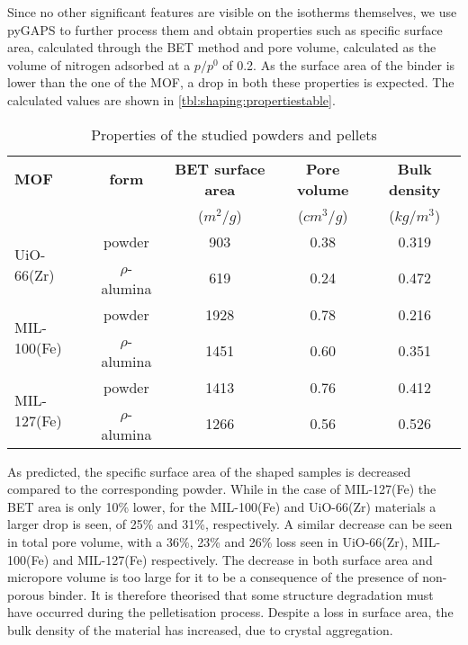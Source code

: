 Since no other significant features are visible on the isotherms themselves,
we use pyGAPS to further process them and obtain properties
such as specific surface area, calculated through the BET method and pore
volume, calculated as the volume of nitrogen
adsorbed at a \(p/p^0\) of 0.2.
As the surface area of the binder is lower than the
one of the MOF, a drop in both these properties is expected.
The calculated values are shown in
\autoref{tbl:shaping:propertiestable}.

\begin{table}[htb]
	\centering
	\caption{Properties of the studied powders and pellets}
	\begin{tabular}{lcccc}
		\toprule
		\textbf{MOF}
		                             & \textbf{form}
		                             & \textbf{BET surface area}
		                             & \textbf{Pore volume}
		                             & \textbf{Bulk density}                                                 \\
		                             &                           & (\(m^2/g\)) & (\(cm^3/g\)) & (\(kg/m^3\)) \\
		\midrule
		\multirow{2}{*}{UiO-66(Zr)}  & powder                    & 903         & 0.38         & 0.319        \\
		                             & \(\rho\)-alumina          & 619         & 0.24         & 0.472        \\
		\multirow{2}{*}{MIL-100(Fe)} & powder                    & 1928        & 0.78         & 0.216        \\
		                             & \(\rho\)-alumina          & 1451        & 0.60         & 0.351        \\
		\multirow{2}{*}{MIL-127(Fe)} & powder                    & 1413        & 0.76         & 0.412        \\
		                             & \(\rho\)-alumina          & 1266        & 0.56         & 0.526        \\
		\bottomrule
	\end{tabular}%
	\label{tbl:shaping:propertiestable}
\end{table}%

As predicted, the specific surface area of the shaped samples is
decreased compared to the corresponding powder. While in the case
of MIL-127(Fe) the BET area is only 10\% lower, for the MIL-100(Fe)
and UiO-66(Zr) materials a larger drop is seen, of 25\% and 31\%,
respectively.
A similar decrease can be seen in total pore volume,
with a 36\%, 23\% and 26\% loss seen
in UiO-66(Zr), MIL-100(Fe) and MIL-127(Fe) respectively.
The decrease in both surface area and micropore volume is
too large for it to be a consequence of the presence of non-porous binder.
It is therefore theorised that some structure degradation must have
occurred during the pelletisation process.
Despite a loss in surface area, the bulk density of the material
has increased, due to crystal aggregation.